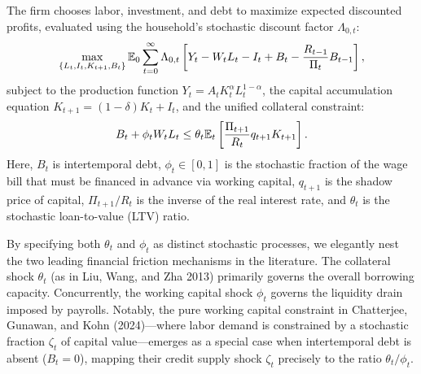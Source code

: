 The firm chooses labor, investment, and debt to maximize expected discounted
profits, evaluated using the household's stochastic discount factor \(\Lambda_{0,t}\):
\begin{equation}
    \max_{\{L_t, I_t, K_{t+1}, B_t\}} \mathbb{E}_0 \sum_{t=0}^{\infty} \Lambda_{0,t}
    \left[ Y_t - W_t L_t - I_t + B_t - \frac{R_{t-1}}{\Pi_t}B_{t-1} \right],
    \label{eq:simulation_firm_problem}
\end{equation}
subject to the production function \(Y_t = A_t K_t^\alpha L_t^{1-\alpha}\), the
capital accumulation equation \(K_{t+1}=(1-\delta)K_t+I_t\), and the unified
collateral constraint:
\begin{equation}
    B_t + \phi_t W_t L_t \leq \theta_t \mathbb{E}_t \left[ \frac{\Pi_{t+1}}{R_t} q_{t+1} K_{t+1} \right].
    \label{eq:simulation_collateral}
\end{equation}
Here, \(B_t\) is intertemporal debt, \(\phi_t \in [0,1]\) is the stochastic fraction
of the wage bill that must be financed in advance via working capital, \(q_{t+1}\)
is the shadow price of capital, \(\Pi_{t+1}/R_t\) is the inverse of the real interest
rate, and \(\theta_t\) is the stochastic loan-to-value (LTV) ratio.

By specifying both \(\theta_t\) and \(\phi_t\) as distinct stochastic processes, we
elegantly nest the two leading financial friction mechanisms in the literature.
The collateral shock \(\theta_t\) (as in Liu, Wang, and Zha 2013) primarily
governs the overall borrowing capacity. Concurrently, the working capital shock
\(\phi_t\) governs the liquidity drain imposed by payrolls. Notably, the pure
working capital constraint in Chatterjee, Gunawan, and Kohn (2024)---where labor
demand is constrained by a stochastic fraction \(\zeta_t\) of capital value---emerges
as a special case when intertemporal debt is absent (\(B_t=0\)), mapping their
credit supply shock \(\zeta_t\) precisely to the ratio \(\theta_t / \phi_t\).

